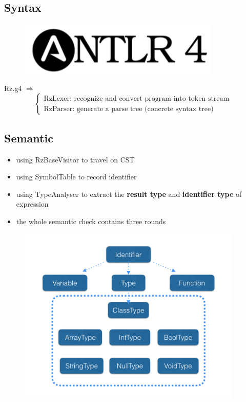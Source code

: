 \documentclass{beamer}
\begin{document}
\subsection{Syntax}
\begin{frame}
	\begin{figure}
		\centering
		\includegraphics[width = \textwidth]{antlr}
	\end{figure}
	Rz.g4 $\Rightarrow$
	\[\begin{cases}
		\text{RzLexer: recognize and convert program into token stream} \\
		\text{RzParser: generate a parse tree (concrete syntax tree) }
	\end{cases}\]
\end{frame}

\subsection{Semantic}
\begin{frame}
	\begin{itemize}
		\item using RzBaseVisitor to travel on CST
		\item using SymbolTable to record identifier
		\item using TypeAnalyser to extract the \textbf{result type} and \textbf{identifier type} of expression
		\item the whole semantic check contains three rounds
	\end{itemize}
\end{frame}

\begin{frame}
	\begin{figure}
		\centering
		\includegraphics[width = 0.95\textwidth]{inheritance_1}
	\end{figure}
\end{frame}
\end{document}
